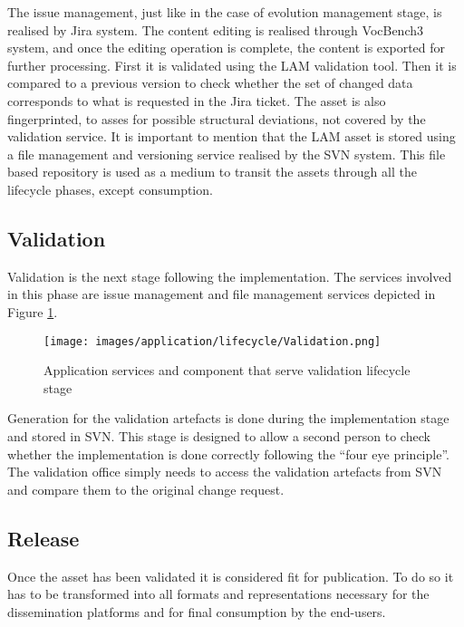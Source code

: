 	The issue management, just like in the case of evolution management stage, is realised by Jira system. The content editing is realised through VocBench3 system, and once the editing operation is complete, the content is exported for further processing. First it is validated using the LAM validation tool. Then it is compared to a previous version to check whether the set of changed data corresponds to what is requested in the Jira ticket. The asset is also fingerprinted, to asses for possible structural deviations, not covered by the validation service. It is important to mention that the LAM asset is stored using a file management and versioning service realised by the SVN system. This file based repository is used as a medium to transit the assets through all the lifecycle phases, except consumption. 

	\subsection{Validation}
	
	Validation is the next stage following the implementation. The services involved in this phase are issue management and file management services depicted in Figure \ref{fig:app-validation}.
		
	 \begin{figure}[!h]
		\centering
		\texttt{[image: images/application/lifecycle/Validation.png]}
		\caption{Application services and component that serve validation lifecycle stage}
		\label{fig:app-validation}
	\end{figure}	
	
	Generation for the validation artefacts is done during the implementation stage and stored in SVN. This stage is designed to allow a second person to check whether the implementation is done correctly following the ``four eye principle''. The validation office simply needs to access the validation artefacts from SVN and compare them to the original change request. 
	
	\subsection{Release}
	\label{sec:release}
	
	Once the asset has been validated it is considered fit for publication. To do so it has to be transformed into all formats and representations necessary for the dissemination platforms and for final consumption by the end-users. 
	

